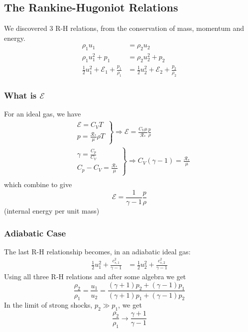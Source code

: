 \documentclass[12pt,a4paper]{article}
\begin{document}
\subsection{The Rankine-Hugoniot Relations}
    We discovered 3 R-H relations, from the conservation of mass, momentum and energy.
    \begin{align*}
        \rho_1 u_1&=\rho_2 u_2\\
        \rho_1 u_1^2+p_1&=\rho_2 u_2^2+p_2\\
        \frac{1}{2} u_1^2+\mathcal{E}_1+\frac{p_1}{\rho_1}&=\frac{1}{2} u_2^2+\mathcal{E}_2+\frac{p_2}{\rho_2}
    \end{align*}
    \subsubsection{What is $\mathcal{E}$}
    For an ideal gas, we have
    $$
    \begin{aligned}
    & \left.\begin{array}{l}
    \mathcal{E}=C_V T \\
    p=\frac{\mathcal{R}_*}{\mu} \rho T
    \end{array}\right\} \Rightarrow \mathcal{E}=\frac{C_V \mu}{\mathcal{R}_*} \frac{p}{\rho} \\
    & \left.\begin{array}{l}
    \gamma=\frac{C_p}{C_V} \\
    C_p-C_V=\frac{\mathcal{R}_*}{\mu}
    \end{array}\right\} \Rightarrow C_V(\gamma-1)=\frac{\mathcal{R}_*}{\mu} \\
    &
    \end{aligned}
    $$
    which combine to give
    $$
    \mathcal{E}=\frac{1}{\gamma-1} \frac{p}{\rho}
    $$
    (internal energy per unit mass)
    \subsubsection{Adiabatic Case}
    The last R-H relationship becomes, in an adiabatic ideal gas:
    \begin{align*}
        \frac{1}{2} u_1^2+\frac{c_{s, 1}^2}{\gamma-1}&=\frac{1}{2} u_2^2+\frac{c_{s, 2}^2}{\gamma-1}
    \end{align*}
    Using all three R-H relations and after some algebra we get
    $$
    \frac{\rho_2}{\rho_1}=\frac{u_1}{u_2}=\frac{(\gamma+1) p_2+(\gamma-1) p_1}{(\gamma+1) p_1+(\gamma-1) p_2}
    $$
    In the limit of strong shocks, $p_2 \gg p_1$, we get
    $$
    \frac{\rho_2}{\rho_1} \rightarrow \frac{\gamma+1}{\gamma-1}
    $$
\end{document}
